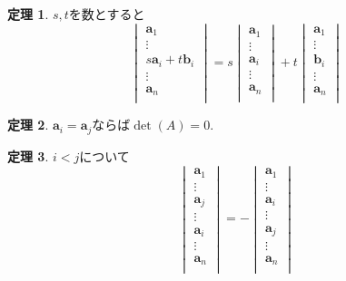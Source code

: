 \documentclass[dvipdfmx,a4paper,11pt]{article} %
\theoremstyle{definition}
\newtheorem{thm}{定理}
\begin{document}
\begin{thm}\cite[定理 3.2.1]{O}
$s, t$を数とすると
$$
\begin{vmatrix}
\bm{a}_1 \\
\vdots \\
s\bm{a}_i + t \bm{b}_i \\
\vdots \\
\bm{a}_n\\
\end{vmatrix}
=
s
\begin{vmatrix}
\bm{a}_1 \\
\vdots \\
\bm{a}_i \\
\vdots \\
\bm{a}_n\\
\end{vmatrix}
+
t
\begin{vmatrix}
\bm{a}_1 \\
\vdots \\
 \bm{b}_i \\
\vdots \\
\bm{a}_n\\
\end{vmatrix}
$$
\end{thm}


\begin{thm}\cite[定理 3.2.2]{O}
$\bm{a}_i=\bm{a}_j$ならば$\det (A)=0$.
\end{thm}

\begin{thm}\cite[定理 3.2.3]{O}
$i < j$について
$$
\begin{vmatrix}
\bm{a}_1 \\
\vdots \\
\bm{a}_j \\
\vdots \\
\bm{a}_i \\
\vdots \\
\bm{a}_n\\
\end{vmatrix}
=
-
\begin{vmatrix}
\bm{a}_1 \\
\vdots \\
\bm{a}_i \\
\vdots \\
\bm{a}_j\\
\vdots \\
\bm{a}_n\\
\end{vmatrix}
$$
\end{thm}
\end{document}
